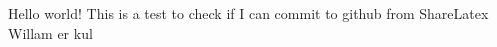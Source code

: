 \documentclass{article}
\begin{document}
  Hello world!
  This is a test to check if I can commit to github from ShareLatex
  Willam er kul
\end{document}
